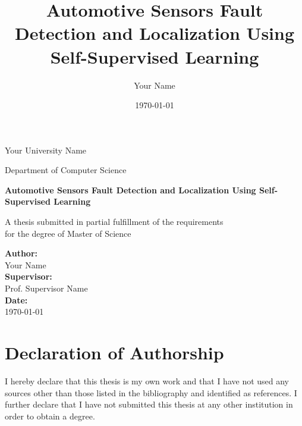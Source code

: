 \documentclass[12pt,a4paper,twoside,openright]{scrbook}
\title{Automotive Sensors Fault Detection and Localization Using Self-Supervised Learning}
\author{Your Name}
\date{\today}
\newcommand{\university}{Your University Name}
\newcommand{\department}{Department of Computer Science}
\newcommand{\degreetype}{Master of Science}
\newcommand{\supervisor}{Prof. Supervisor Name}
\begin{document}

\frontmatter

\begin{titlepage}
    \centering
    \vspace*{2cm}

    {\LARGE \university \par}
    \vspace{0.5cm}
    {\Large \department \par}

    \vspace{3cm}

    {\huge\bfseries Automotive Sensors Fault Detection and Localization Using Self-Supervised Learning\par}

    \vspace{2cm}

    {\Large A thesis submitted in partial fulfillment of the requirements\\
    for the degree of \degreetype\par}

    \vspace{2cm}

    {\large
    \textbf{Author:}\\
    Your Name\\[0.5cm]

    \textbf{Supervisor:}\\
    \supervisor\\[0.5cm]

    \textbf{Date:}\\
    \today
    }

    \vfill
\end{titlepage}

\chapter*{Declaration of Authorship}

I hereby declare that this thesis is my own work and that I have not used any sources other than those listed in the bibliography and identified as references. I further declare that I have not submitted this thesis at any other institution in order to obtain a degree.

\vspace{2cm}
\end{document}

